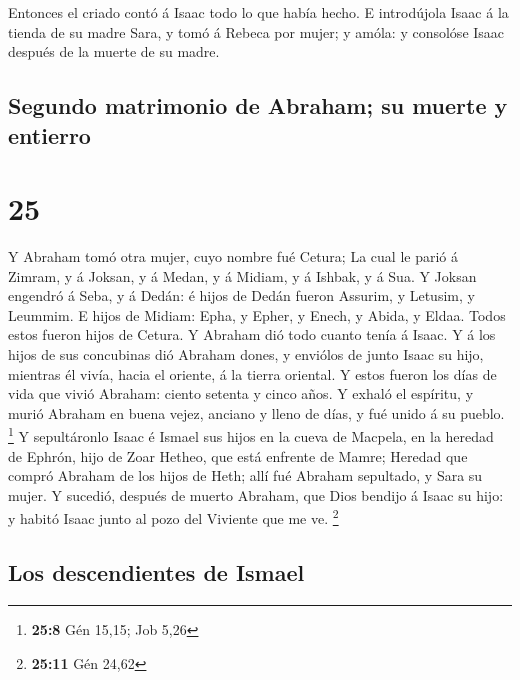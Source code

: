  Entonces el criado contó á Isaac todo lo que había
hecho.  E introdújola Isaac á la tienda de su madre Sara,
y tomó á Rebeca por mujer; y amóla: y consolóse Isaac después de la
muerte de su madre.

\hypertarget{segundo-matrimonio-de-abraham-su-muerte-y-entierro}{%
\subsection{Segundo matrimonio de Abraham; su muerte y
entierro}\label{segundo-matrimonio-de-abraham-su-muerte-y-entierro}}

\hypertarget{section-24}{%
\section{25}\label{section-24}}

 Y Abraham tomó otra mujer, cuyo nombre fué Cetura;
 La cual le parió á Zimram, y á Joksan, y á Medan, y á
Midiam, y á Ishbak, y á Sua.  Y Joksan engendró á Seba, y
á Dedán: é hijos de Dedán fueron Assurim, y Letusim, y Leummim.
 E hijos de Midiam: Epha, y Epher, y Enech, y Abida, y
Eldaa. Todos estos fueron hijos de Cetura.  Y Abraham dió
todo cuanto tenía á Isaac.  Y á los hijos de sus
concubinas dió Abraham dones, y enviólos de junto Isaac su hijo,
mientras él vivía, hacia el oriente, á la tierra oriental.
 Y estos fueron los días de vida que vivió Abraham: ciento
setenta y cinco años.  Y exhaló el espíritu, y murió
Abraham en buena vejez, anciano y lleno de días, y fué unido á su
pueblo. \footnote{\textbf{25:8} Gén 15,15; Job 5,26}  Y
sepultáronlo Isaac é Ismael sus hijos en la cueva de Macpela, en la
heredad de Ephrón, hijo de Zoar Hetheo, que está enfrente de Mamre;
 Heredad que compró Abraham de los hijos de Heth; allí
fué Abraham sepultado, y Sara su mujer.  Y sucedió,
después de muerto Abraham, que Dios bendijo á Isaac su hijo: y habitó
Isaac junto al pozo del Viviente que me ve. \footnote{\textbf{25:11} Gén
  24,62}

\hypertarget{los-descendientes-de-ismael}{%
\subsection{Los descendientes de
Ismael}\label{los-descendientes-de-ismael}}


